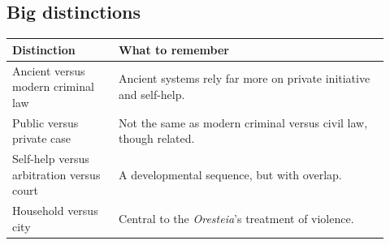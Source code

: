 \documentclass[11pt]{article}
\begin{document}
\subsection*{Big distinctions}
\begin{tabular}{@{}p{0.26\linewidth}p{0.66\linewidth}@{}}
\toprule
\textbf{Distinction} & \textbf{What to remember} \\
\midrule
Ancient versus modern criminal law & Ancient systems rely far more on private initiative and self-help. \\
Public versus private case & Not the same as modern criminal versus civil law, though related. \\
Self-help versus arbitration versus court & A developmental sequence, but with overlap. \\
Household versus city & Central to the \textit{Oresteia}'s treatment of violence. \\
\bottomrule
\end{tabular}
\end{document}
